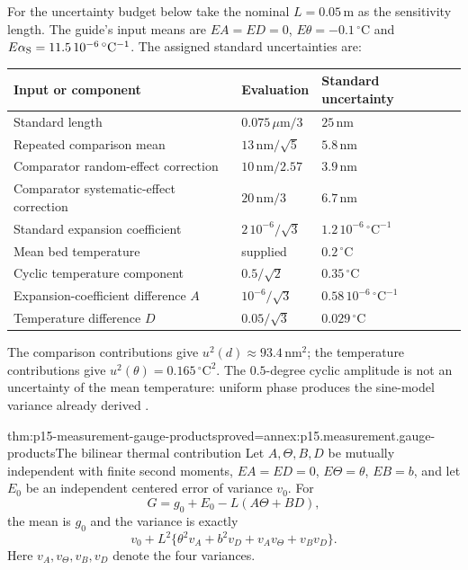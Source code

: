 For the uncertainty budget below take the nominal \(L=0.05\,\mathrm m\)
as the sensitivity length. The guide's input means are
\(EA=ED=0\), \(E\theta=-0.1\,{}^\circ\mathrm C\) and
\(E\alpha_{\rm S}=11.5\,10^{-6}\,{}^\circ\mathrm C^{-1}\).
The assigned standard uncertainties are:
\begin{center}
\begin{tabularx}{\linewidth}{@{}Xll@{}}
\toprule
Input or component & Evaluation & Standard uncertainty\\
\midrule
Standard length & \(0.075\,\mu\mathrm m/3\) & \(25\,\mathrm{nm}\)\\
Repeated comparison mean & \(13\,\mathrm{nm}/\sqrt5\) & \(5.8\,\mathrm{nm}\)\\
Comparator random-effect correction & \(10\,\mathrm{nm}/2.57\) & \(3.9\,\mathrm{nm}\)\\
Comparator systematic-effect correction & \(20\,\mathrm{nm}/3\) & \(6.7\,\mathrm{nm}\)\\
Standard expansion coefficient & \(2\,10^{-6}/\sqrt3\) & \(1.2\,10^{-6}\,{}^\circ\mathrm C^{-1}\)\\
Mean bed temperature & supplied & \(0.2\,{}^\circ\mathrm C\)\\
Cyclic temperature component & \(0.5/\sqrt2\) & \(0.35\,{}^\circ\mathrm C\)\\
Expansion-coefficient difference \(A\) & \(10^{-6}/\sqrt3\) & \(0.58\,10^{-6}\,{}^\circ\mathrm C^{-1}\)\\
Temperature difference \(D\) & \(0.05/\sqrt3\) & \(0.029\,{}^\circ\mathrm C\)\\
\bottomrule
\end{tabularx}
\end{center}
The comparison contributions give \(u^2(d)\approx93.4\,\mathrm{nm}^2\);
the temperature contributions give \(u^2(\theta)=0.165\,{}^\circ\mathrm C^2\).
The \(0.5\)-degree cyclic amplitude is not an uncertainty of the mean
temperature: uniform phase produces the sine-model variance already derived
\cite[H.1.3]{JCGM1002008EMeasurement}.

\begin{hbtheorem}{thm:p15-measurement-gauge-products}{proved=annex:p15.measurement.gauge-products}{The bilinear thermal contribution}
Let \(A,\Theta,B,D\) be mutually independent with finite second moments,
\(EA=ED=0\), \(E\Theta=\theta\), \(EB=b\), and let \(E_0\) be an
independent centered error of variance \(v_0\). For
\[
 G=g_0+E_0-L(A\Theta+BD),
\]
the mean is \(g_0\) and the variance is exactly
\[
 v_0+L^2\{\theta^2v_A+b^2v_D+v_Av_\Theta+v_Bv_D\}.
\]
Here \(v_A,v_\Theta,v_B,v_D\) denote the four variances.
\end{hbtheorem}

